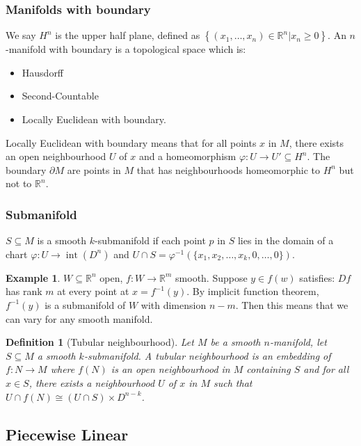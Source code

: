 \documentclass{article}
\newtheorem{definition}[theorem]{Definition}
\theoremstyle{definition}
\newtheorem{example}[theorem]{Example}
\numberwithin{theorem}{section}
\numberwithin{equation}{section}
\DeclareMathOperator{\Int}{int}
\begin{document}
\subsubsection{Manifolds with boundary}
We say $H^n$ is the upper half plane, defined as $\left\{(x_1, \ldots, x_n) \in \mathbb{R}^n | x_n \geq 0\right\}$. An $n$-manifold with boundary is a topological space which is:

\begin{itemize}
    \item Hausdorff
    \item Second-Countable
    \item Locally Euclidean with boundary.
\end{itemize}
Locally Euclidean with boundary means that for all points $x$ in $M$, there exists an open neighbourhood $U$ of $x$ and a homeomorphism $\varphi:U \rightarrow U' \subseteq H^n$. 
The boundary $\partial M$ are points in $M$ that has neighbourhoods homeomorphic to $H^n$ but not to $\mathbb{R}^n$. 

\subsubsection{Submanifold}
$S \subseteq M$ is a smooth $k$-submanifold if each point $p$ in $S$ lies in the domain of a chart $\varphi : U \rightarrow \Int(D^n)$ and $U \cap S = \varphi^{-1} (\{x_1, x_2, \ldots,  x_k, 0, \ldots, 0\})$. 

\begin{example}
    $W \subseteq \mathbb{R}^n$ open, $f : W \rightarrow \mathbb{R}^m$ smooth. Suppose $y \in f(w)$ satisfies: $Df$ has rank $m$ at every point at $x = f^{-1}(y)$. By implicit function theorem, $f^{-1}(y)$ is a submanifold of $W$ with dimension $n - m$. Then this means that we can vary for any smooth manifold. 
\end{example}

\begin{definition}[Tubular neighbourhood]
    Let $M$ be a smooth $n$-manifold, let $S \subseteq M$ a smooth $k$-submanifold. A tubular neighbourhood is an embedding of $f : N \rightarrow M$ where $f(N)$ is an open neighbourhood in $M$ containing $S$ and for all $x \in S$, there exists a neighbourhood $U$ of $x$ in $M$ such that $U \cap f(N) \cong  (U \cap S) \times D^{n - k}$. 
\end{definition}

\subsection{Piecewise Linear}
\end{document}
